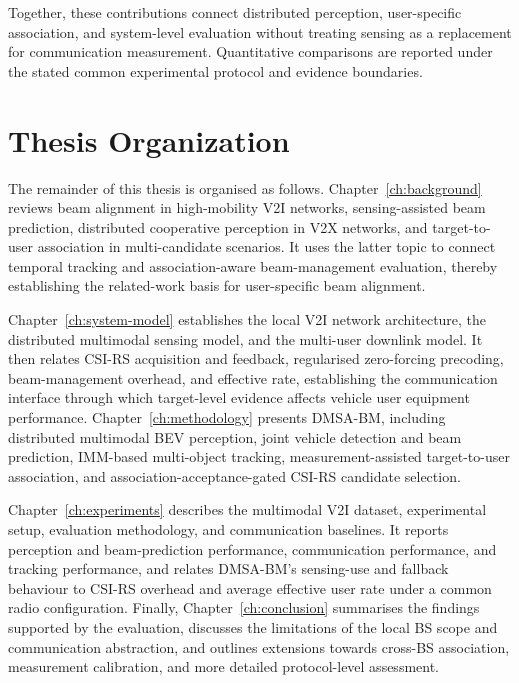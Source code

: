 Together, these contributions connect distributed perception, user-specific
association, and system-level evaluation without treating sensing as a
replacement for communication measurement.  Quantitative comparisons are
reported under the stated common experimental protocol and evidence boundaries.

\section{Thesis Organization}
\label{sec:introduction-organization}

The remainder of this thesis is organised as follows.  Chapter~\ref{ch:background}
reviews beam alignment in high-mobility V2I networks, sensing-assisted beam
prediction, distributed cooperative perception in V2X networks, and
target-to-user association in multi-candidate scenarios.  It uses the latter
topic to connect temporal tracking and association-aware beam-management
evaluation, thereby establishing the related-work basis for user-specific beam
alignment.

Chapter~\ref{ch:system-model} establishes the local V2I network architecture,
the distributed multimodal sensing model, and the multi-user downlink model.  It
then relates CSI-RS acquisition and feedback, regularised zero-forcing
precoding, beam-management
overhead, and effective rate, establishing the communication interface through
which target-level evidence affects vehicle user equipment performance.
Chapter~\ref{ch:methodology} presents DMSA-BM, including distributed multimodal
BEV perception, joint vehicle detection and beam prediction, IMM-based
multi-object tracking, measurement-assisted target-to-user association, and
association-acceptance-gated CSI-RS candidate selection.

Chapter~\ref{ch:experiments} describes the multimodal V2I dataset, experimental
setup, evaluation methodology, and communication baselines.  It reports
perception and beam-prediction performance, communication performance, and
tracking performance, and relates DMSA-BM's sensing-use and
fallback behaviour to CSI-RS overhead and average effective user rate under a
common radio configuration.  Finally, Chapter~\ref{ch:conclusion} summarises the findings
supported by the evaluation, discusses the limitations of the local BS scope and
communication abstraction, and outlines extensions towards cross-BS association,
measurement calibration, and more detailed protocol-level assessment.
